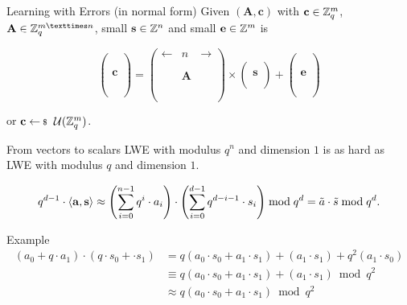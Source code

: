 \documentclass[presentation,smaller]{beamer}
\renewcommand{\vec}[1]{\ensuremath{\mathbf{#1}}\xspace}
\begin{document}
\begin{frame}[label={sec:org1f4bd90}]{Learning with Errors (in normal form)}
Given \((\vec{A},\vec{c})\) with \(\vec{c} \in \ZZ_q^{m}\), \(\vec{A} \in \ZZ_q^{m × n}\), small \(\vec{s} \in \ZZ^{n}\) and small \(\vec{e} \in \ZZ^{m}\) is

\[
\left(\begin{array}{c}
\\
\\
\\ 
\vec{c} \\
\\
\\
\\
\end{array} \right) = \left(
\begin{array}{ccc}
\leftarrow & n & \rightarrow \\
\\
\\ 
& \vec{A} & \\
\\
\\
\\
\end{array} \right) \times \left( \begin{array}{c}
\\
\vec{s} \\
\\
\end{array} \right) + \left(
\begin{array}{c}
\\
\\
\\ 
\vec{e} \\
\\
\\
\\
\end{array} 
\right)
\]

or \(\vec{c} \sample \mathcal{U}(\ZZ_q^{m})\).
\end{frame}

\begin{frame}[label={sec:orgf87bcfc}]{From vectors to scalars}
LWE with modulus \(q^n\) and dimension \(1\) is as hard as LWE with modulus \(q\) and dimension \(1\).

\[q^{d-1} \cdot \Angle{\vec{a},\vec{s}} \approx \left(\sum_{i=0}^{n-1} q^{i} \cdot a_{i}\right) \cdot \left(\sum_{i=0}^{d-1} q^{d-i-1} \cdot s_{i}\right) \bmod q^{d} = \tilde{a} \cdot \tilde{s} \bmod q^{d}.\] 

\begin{block}{Example}
\begin{align*}
\left(a_0 + q\cdot a_1\right) \cdot \left(q \cdot s_0 + \cdot s_1\right) &= q(a_0\cdot s_0 + a_1 \cdot s_1) + (a_1 \cdot s_1) + q^2 (a_1 \cdot s_0)\\
&\equiv q(a_0\cdot s_0 + a_1 \cdot s_1) + (a_1 \cdot s_1) \bmod q^2\\
&\approx q(a_0\cdot s_0 + a_1 \cdot s_1) \bmod q^2
\end{align*}
\end{block}
\end{frame}
\end{document}
